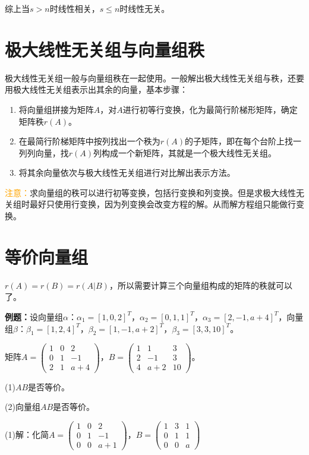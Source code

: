 \documentclass[UTF8, 12pt]{ctexart}
\begin{document}
综上当$s>n$时线性相关，$s\leqslant n$时线性无关。

\section{极大线性无关组与向量组秩}

极大线性无关组一般与向量组秩在一起使用。一般解出极大线性无关组与秩，还要用极大线性无关组表示出其余的向量，基本步骤：

\begin{enumerate}
    \item 将向量组拼接为矩阵$A$，对$A$进行初等行变换，化为最简行阶梯形矩阵，确定矩阵秩$r(A)$。
    \item 在最简行阶梯矩阵中按列找出一个秩为$r(A)$的子矩阵，即在每个台阶上找一列列向量，找$r(A)$列构成一个新矩阵，其就是一个极大线性无关组。
    \item 将其余向量依次与极大线性无关组进行对比解出表示方法。
\end{enumerate}

\textcolor{orange}{注意：}求向量组的秩可以进行初等变换，包括行变换和列变换。但是求极大线性无关组时最好只使用行变换，因为列变换会改变方程的解。从而解方程组只能做行变换。

\section{等价向量组}

$r(A)=r(B)=r(A|B)$，所以需要计算三个向量组构成的矩阵的秩就可以了。

\textbf{例题：}设向量组$\alpha$：$\alpha_1=[1,0,2]^T$，$\alpha_2=[0,1,1]^T$，$\alpha_3=[2,-1,a+4]^T$，向量组$\beta$：$\beta_1=[1,2,4]^T$，$\beta_2=[1,-1,a+2]^T$，$\beta_3=[3,3,10]^T$。

矩阵$A=\left(\begin{array}{ccc}
    1 & 0 & 2 \\
    0 & 1 & -1 \\
    2 & 1 & a+4
\end{array}\right)$，$B=\left(\begin{array}{ccc}
    1 & 1 & 3 \\
    2 & -1 & 3 \\
    4 & a+2 & 10
\end{array}\right)$。\medskip

(1)$AB$是否等价。

(2)向量组$AB$是否等价。

(1)解：化简$A=\left(\begin{array}{ccc}
    1 & 0 & 2 \\
    0 & 1 & -1 \\
    0 & 0 & a+1
\end{array}\right)$，$B=\left(\begin{array}{ccc}
    1 & 3 & 1 \\
    0 & 1 & 1 \\
    0 & 0 & a
\end{array}\right)$
\end{document}
